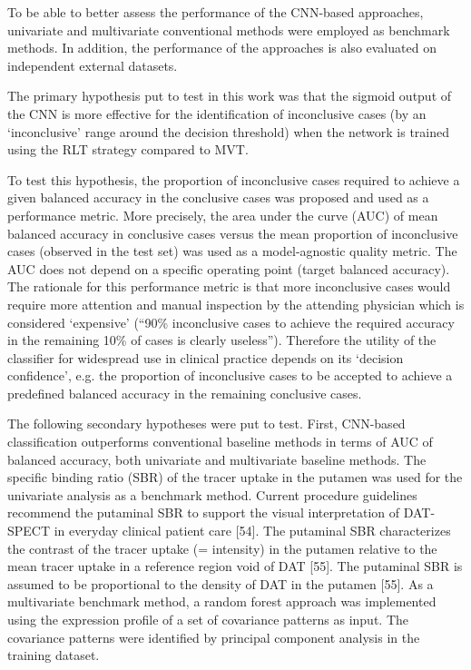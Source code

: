 To be able to better assess the performance of the CNN-based approaches, univariate and multivariate conventional methods were employed as 
benchmark methods. In addition, the performance of the approaches is also evaluated on independent external datasets.


The primary hypothesis put to test in this work was that the sigmoid output of the CNN is more effective for the identification of inconclusive cases 
(by an `inconclusive' range around the decision threshold) when the network is trained using the RLT strategy compared to MVT.

To test this hypothesis, the proportion of inconclusive cases required to achieve a given balanced accuracy in the conclusive cases 
was proposed and used as a performance metric.
More precisely, the area under the curve (AUC) of mean balanced accuracy in conclusive cases versus the mean proportion of inconclusive cases 
(observed in the test set) was used as a model-agnostic quality metric. 
The AUC does not depend on a specific operating point (target balanced accuracy).  
The rationale for this performance metric is that more inconclusive cases would require more attention and manual inspection 
by the attending physician which is considered `expensive'
(“90\% inconclusive cases to achieve the required accuracy in the remaining 10\% of cases is clearly useless”).
Therefore the utility of the classifier for widespread use in clinical practice depends on its `decision confidence', 
e.g. the proportion of inconclusive cases to be accepted to achieve a predefined balanced accuracy in the remaining conclusive cases. 

The following secondary hypotheses were put to test. 
First, CNN-based classification outperforms conventional baseline methods in terms of AUC of balanced accuracy, 
both univariate and multivariate baseline methods. 
The specific binding ratio (SBR) of the tracer uptake in the putamen was used for the univariate analysis as a benchmark method.
Current procedure guidelines recommend the putaminal SBR to support the visual interpretation of DAT-SPECT in everyday clinical patient care [54]. 
The putaminal SBR characterizes the contrast of the tracer uptake (= intensity) in the putamen relative to the mean tracer uptake in a reference 
region void of DAT [55]. 
The putaminal SBR is assumed to be proportional to the density of DAT in the putamen [55]. 
As a multivariate benchmark method, a random forest approach was implemented using the expression profile of a set of covariance patterns as input. 
The covariance patterns were identified by principal component analysis in the training dataset. 

